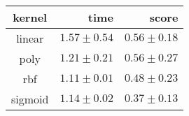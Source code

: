 \begin{tabular}{crr}
\toprule
\textbf{kernel} & \textbf{time} & \textbf{score}\\
\midrule
linear & $1.57 \pm 0.54$ & $0.56 \pm 0.18$\\
poly & $1.21 \pm 0.21$ & $0.56 \pm 0.27$\\
rbf & $1.11 \pm 0.01$ & $0.48 \pm 0.23$\\
sigmoid & $1.14 \pm 0.02$ & $0.37 \pm 0.13$\\
\bottomrule
\end{tabular}
